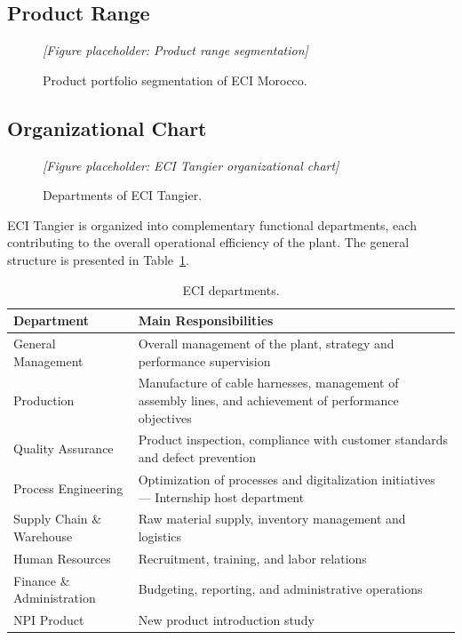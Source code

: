 \subsection{Product Range}

\begin{figure}[H]
  \centering
  \textit{[Figure placeholder: Product range segmentation]}
  \caption{Product portfolio segmentation of ECI Morocco.}
  \label{fig:product-range}
\end{figure}

\subsection{Organizational Chart}

\begin{figure}[H]
  \centering
  \textit{[Figure placeholder: ECI Tangier organizational chart]}
  \caption{Departments of ECI Tangier.}
  \label{fig:org-chart}
\end{figure}

ECI Tangier is organized into complementary functional departments, each contributing to the overall operational efficiency of the plant. The general structure is presented in Table~\ref{tab:eci-departments}.

\begin{table}[H]
  \centering
  \caption{ECI departments.}
  \label{tab:eci-departments}
  \begin{tabular}{p{4cm} p{8cm}}
    \toprule
    \textbf{Department} & \textbf{Main Responsibilities} \\
    \midrule
    General Management & Overall management of the plant, strategy and performance supervision \\
    Production & Manufacture of cable harnesses, management of assembly lines, and achievement of performance objectives \\
    Quality Assurance & Product inspection, compliance with customer standards and defect prevention \\
    Process Engineering & Optimization of processes and digitalization initiatives --- Internship host department \\
    Supply Chain \& Warehouse & Raw material supply, inventory management and logistics \\
    Human Resources & Recruitment, training, and labor relations \\
    Finance \& Administration & Budgeting, reporting, and administrative operations \\
    NPI Product & New product introduction study \\
    \bottomrule
  \end{tabular}
\end{table}

